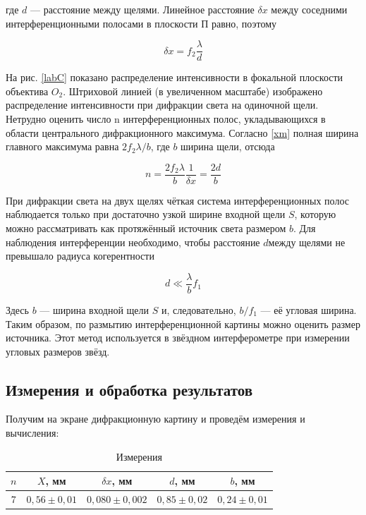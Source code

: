 \documentclass[a4paper,12pt]{article} %
\begin{document}
где $ d $ --- расстояние между щелями. Линейное расстояние $ \delta x $ между соседними интерференционными полосами в плоскости П равно, поэтому

\begin{equation}\label{dx}
\delta x = f_2 \dfrac{\lambda}{d}
\end{equation}

На рис. \ref{labC} показано распределение интенсивности в фокальной плоскости объектива $ O_2 $. Штриховой линией (в увеличенном масштабе)
изображено распределение интенсивности при дифракции света на одиночной щели. Нетрудно оценить число n интерференционных полос,
укладывающихся в области центрального дифракционного максимума.
Согласно \eqref{xm} полная ширина главного максимума равна $ 2 f_2 \lambda /b $, где $ b $ ширина щели, отсюда

\begin{equation}\label{n}
n = \dfrac{2f_2 \lambda}{b} \dfrac{1}{\delta x} = \dfrac{2d}{b}
\end{equation}

При дифракции света на двух щелях чёткая система интерференционных полос наблюдается только при достаточно узкой ширине входной щели $ S $, которую можно рассматривать как протяжённый источник света размером $ b $. Для наблюдения интерференции необходимо, чтобы расстояние $ d $между щелями не превышало радиуса когерентности

\begin{equation}\label{}
d \ll \dfrac{\lambda}{b} f_1
\end{equation}

Здесь $ b $ --- ширина входной щели $ S $ и, следовательно, $  b/f_1 $ --- её угловая ширина. Таким образом, по размытию интерференционной картины можно оценить размер источника. Этот метод используется в звёздном интерферометре при измерении угловых размеров звёзд.

\subsection{Измерения и обработка результатов}

Получим на экране дифракционную картину и проведём измерения и вычисления:

\begin{table}[h!]
	\centering
	\caption{Измерения}
	\begin{tabular}{|c|c|c|c|c|} \hline
		$n$&	$X$, мм&	$\delta x$, мм& $d$, мм & $b$, мм \\
		\hline
		7&	$0,56\pm 0,01$ & $0,080\pm 0,002$&	$0,85\pm0,02$&	$0,24\pm0,01$ \\ \hline
	\end{tabular}   
\end{table}
\end{document}
